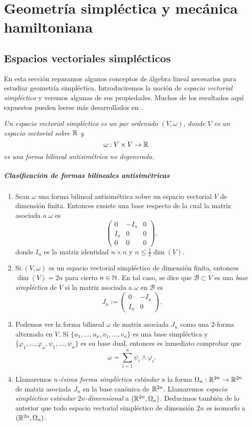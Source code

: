 \chapter{Geometría simpléctica y mecánica hamiltoniana}
\section{Espacios vectoriales simplécticos}\label{sec:vectoriales}
En esta sección repasamos algunos conceptos de álgebra lineal necesarios para estudiar geometría simpléctica. Introduciremos la noción de \emph{espacio vectorial simpléctico} y veremos algunas de sus propiedades. Muchos de los resultados aquí expuestos pueden leerse más desarrollados en \cite{algebra}.
\begin{defn}
  \em
Un \emph{espacio vectorial simpléctico} es un par ordenado $(V,\omega)$, donde $V$ es un espacio vectorial sobre $\mathbb{R}$ y 
	\[
	  \omega: V \times V \rightarrow \mathbb{R}
	\]
	es una forma bilineal antisimétrica no degenerada.
\end{defn}

\paragraph{\bf Clasificación de formas bilineales antisimétricas}
  \begin{enumerate}
    \item Sean $\omega$ una forma bilineal antisimétrica sobre un espacio vectorial $V$ de dimensión finita. Entonces exsiste una base respecto de la cual la matriz asociada a $\omega$ es
      \[
	\left(
	\begin{array}{ccc}
	  0 & -I_n & 0 \\
	  I_n & 0 & 0 \\
	  0 & 0 & 0
	\end{array}\right),
      \]
      donde $I_n$ es la matriz identidad $n \times n$ y $n\leq \tfrac{1}{2}\dim (V)$.
    \item Si $(V,\omega)$ es un espacio vectorial simpléctico de dimensión finita, entonces $\dim(V)=2n$ para cierto $n \in \mathbb{N}$. En tal caso, se dice que $\mathscr{B}\subset V$ es una \emph{base simpléctica} de $V$ si la matriz asociada a $\omega$ en $\mathscr{B}$ es
\[
  J_n :=
\left(
	\begin{array}{cc}
	  0 & -I_n  \\
	  I_n & 0 
	\end{array}\right).
      \]
    \item Podemos ver la forma bilineal $\omega$ de matriz asociada $J_n$ como una $2$-forma alternada en $V$. Si $\{u_1,\dots,u_n,v_1,\dots,v_n\}$ es una base simpléctica y $\{\varphi_1,\dots, \varphi_n, \psi_1,\dots, \psi_n \}$ es su base dual, entonces es inmediato comprobar que
  \[
    \omega =  \sum_{i=1}^n \psi_i \wedge \varphi_i.
  \]
  \item Llamaremos \emph{$n$-ésima forma simpléctica estándar} a la forma $\Omega_n:\mathbb{R}^{2n} \rightarrow \mathbb{R}^{2n}$ de matriz asociada $J_n$ en la base canónica de $\mathbb{R}^{2n}$. Llamaremos \emph{espacio simpléctico estándar $2n$-dimensional} a $(\mathbb{R}^{2n},\Omega_n)$. Deducimos también de lo anterior que todo espacio vectorial simpléctico de dimensión $2n$ es isomorfo a $(\mathbb{R}^{2n},\Omega_n)$.
\end{enumerate}

